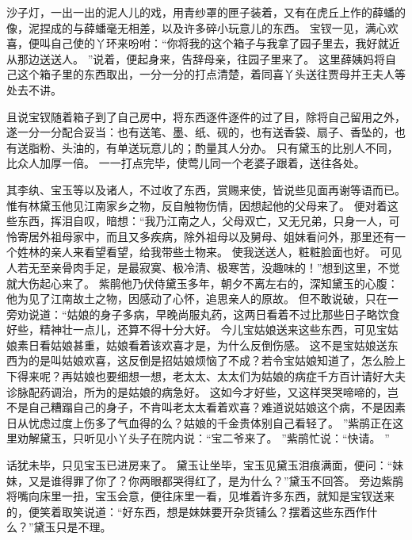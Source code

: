 沙子灯，一出一出的泥人儿的戏，用青纱罩的匣子装着，又有在虎丘上作的薛蟠的像，泥捏成的与薛蟠毫无相差，以及许多碎小玩意儿的东西。
宝钗一见，满心欢喜，便叫自己使的丫环来吩咐：“你将我的这个箱子与我拿了园子里去，我好就近从那边送送人。
”说着，便起身来，告辞母亲，往园子里来了。
这里薛姨妈将自己这个箱子里的东西取出，一分一分的打点清楚，着同喜丫头送往贾母并王夫人等处去不讲。
\par
且说宝钗随着箱子到了自己房中，将东西逐件逐件的过了目，除将自己留用之外，遂一分一分配合妥当：也有送笔、墨、纸、砚的，也有送香袋、扇子、香坠的，也有送脂粉、头油的，有单送玩意儿的；酌量其人分办。
只有黛玉的比别人不同，比众人加厚一倍。
一一打点完毕，使莺儿同一个老婆子跟着，送往各处。
\par
其李纨、宝玉等以及诸人，不过收了东西，赏赐来使，皆说些见面再谢等语而已。
惟有林黛玉他见江南家乡之物，反自触物伤情，因想起他的父母来了。
便对着这些东西，挥泪自叹，暗想：“我乃江南之人，父母双亡，又无兄弟，只身一人，可怜寄居外祖母家中，而且又多疾病，除外祖母以及舅母、姐妹看问外，那里还有一个姓林的亲人来看望看望，给我带些土物来。
使我送送人，粧粧脸面也好。
可见人若无至亲骨肉手足，是最寂寞、极冷清、极寒苦，没趣味的！”想到这里，不觉就大伤起心来了。
紫鹃他乃伏侍黛玉多年，朝夕不离左右的，深知黛玉的心腹：他为见了江南故土之物，因感动了心怀，追思亲人的原故。
但不敢说破，只在一旁劝说道：“姑娘的身子多病，早晚尚服丸药，这两日看着不过比那些日子略饮食好些，精神壮一点儿，还算不得十分大好。
今儿宝姑娘送来这些东西，可见宝姑娘素日看姑娘甚重，姑娘看着该欢喜才是，为什么反倒伤感。
这不是宝姑娘送东西为的是叫姑娘欢喜，这反倒是招姑娘烦恼了不成？若令宝姑娘知道了，怎么脸上下得来呢？再姑娘也要细想一想，老太太、太太们为姑娘的病症千方百计请好大夫诊脉配药调治，所为的是姑娘的病急好。
这如今才好些，又这样哭哭啼啼的，岂不是自己糟蹋自己的身子，不肯叫老太太看着欢喜？难道说姑娘这个病，不是因素日从忧虑过度上伤多了气血得的么？姑娘的千金贵体别自己看轻了。
”紫鹃正在这里劝解黛玉，只听见小丫头子在院内说：“宝二爷来了。
”紫鹃忙说：“快请。
”\par
话犹未毕，只见宝玉已进房来了。
黛玉让坐毕，宝玉见黛玉泪痕满面，便问：“妹妹，又是谁得罪了你了？你两眼都哭得红了，是为什么？”黛玉不回答。
旁边紫鹃将嘴向床里一扭，宝玉会意，便往床里一看，见堆着许多东西，就知是宝钗送来的，便笑着取笑说道：“好东西，想是妹妹要开杂货铺么？摆着这些东西作什么？”黛玉只是不理。
